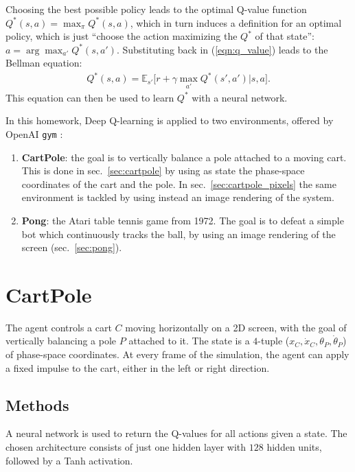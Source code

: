 \documentclass[11pt,a4paper]{scrartcl}
\newcommand{\q}[1]{``#1''}
\begin{document}
Choosing the best possible policy leads to the optimal Q-value function $Q^*(s, a) = \max_\pi Q^*(s,a)$, which in turn induces a definition for an optimal policy, which is just \q{choose the action maximizing the $Q^*$ of that state}: $a = \arg\max_{a'} Q^*(s, a')$. Substituting back in (\ref{eqn:q_value}) leads to the Bellman equation:
\begin{align}\label{eqn:Bellman_equation}
    Q^*(s, a) = \mathbb{E}_{s'} \big[r + \gamma \max_{a'} Q^*(s', a') | s, a\big].
\end{align}
This equation can then be used to learn $Q^*$ with a neural network.

\medskip

In this homework, Deep Q-learning is applied to two environments, offered by OpenAI \texttt{gym} \cite{gym}:
\begin{enumerate}
    \item \textbf{CartPole}: the goal is to vertically balance a pole attached to a moving cart. This is done in sec.~\ref{sec:cartpole} by using as state the phase-space coordinates of the cart and the pole. In sec.~\ref{sec:cartpole_pixels} the same environment is tackled by using instead an image rendering of the system. 
    \item \textbf{Pong}: the Atari table tennis game from 1972. The goal is to defeat a simple bot which continuously tracks the ball, by using an image rendering of the screen (sec.~\ref{sec:pong}).
\end{enumerate}


\section{CartPole \label{sec:cartpole}}
The agent controls a cart $C$ moving horizontally on a 2D screen, with the goal of vertically balancing a pole $P$ attached to it. The state is a $4$-tuple ($x_C, \dot{x}_C, \theta_P, \dot{\theta}_P$) of phase-space coordinates. At every frame of the simulation, the agent can apply a fixed impulse to the cart, either in the left or right direction.

\subsection{Methods}
A neural network is used to return the Q-values for all actions given a state. The chosen architecture consists of just one hidden layer with $128$ hidden units, followed by a Tanh activation. 
\end{document}
